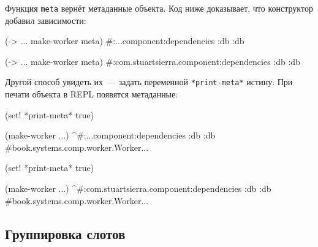 Функция \verb|meta| вернёт метаданные объекта. Код ниже доказывает, что
конструктор добавил зависимости:

\ifx\DEVICETYPE\MOBILE

\begin{english}
  \begin{clojure}
(-> {...} make-worker meta)
#:...component{:dependencies {:db :db}}
  \end{clojure}
\end{english}

\else

\begin{english}
  \begin{clojure}
(-> {...} make-worker meta)
#:com.stuartsierra.component{:dependencies {:db :db}}
  \end{clojure}
\end{english}

\fi

Другой способ увидеть их~--- задать переменной \verb|*print-meta*| истину. При
печати объекта в REPL появятся метаданные:


\ifx\DEVICETYPE\MOBILE

\begin{english}
  \begin{clojure}
(set! *print-meta* true)

(make-worker {...})
^#:...component{:dependencies {:db :db}}
#book.systems.comp.worker.Worker{...}
  \end{clojure}
\end{english}

\else

\begin{english}
  \begin{clojure}
(set! *print-meta* true)

(make-worker {...})
^#:com.stuartsierra.component{:dependencies {:db :db}}
#book.systems.comp.worker.Worker{...}
  \end{clojure}
\end{english}

\fi

\subsection{Группировка слотов}


